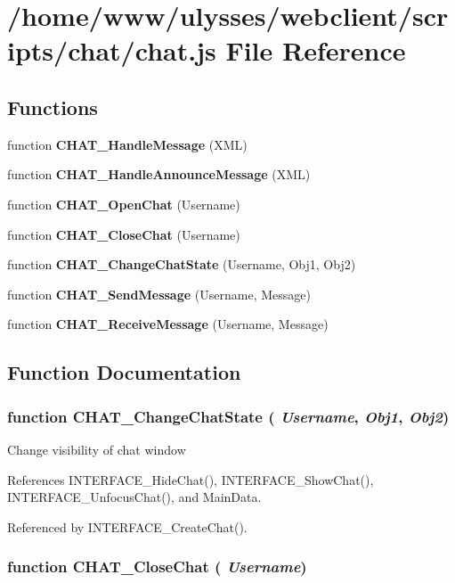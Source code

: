 \section{/home/www/ulysses/webclient/scripts/chat/chat.js File Reference}
\label{chat_2chat_8js}
\subsection*{Functions}
\begin{CompactItemize}
\item 
function {\bf CHAT\_\-HandleMessage} (XML)
\item 
function {\bf CHAT\_\-HandleAnnounceMessage} (XML)
\item 
function {\bf CHAT\_\-OpenChat} (Username)
\item 
function {\bf CHAT\_\-CloseChat} (Username)
\item 
function {\bf CHAT\_\-ChangeChatState} (Username, Obj1, Obj2)
\item 
function {\bf CHAT\_\-SendMessage} (Username, Message)
\item 
function {\bf CHAT\_\-ReceiveMessage} (Username, Message)
\end{CompactItemize}


\subsection{Function Documentation}
\subsubsection{\setlength{\rightskip}{0pt plus 5cm}function CHAT\_\-ChangeChatState ( {\em Username}, \/   {\em Obj1}, \/   {\em Obj2})}\label{chat_2chat_8js_5378e4be2e6578320879a903cabc1ec8}


Change visibility of chat window 

References INTERFACE\_\-HideChat(), INTERFACE\_\-ShowChat(), INTERFACE\_\-UnfocusChat(), and MainData.

Referenced by INTERFACE\_\-CreateChat().
\subsubsection{\setlength{\rightskip}{0pt plus 5cm}function CHAT\_\-CloseChat ( {\em Username})}\label{chat_2chat_8js_c9f7e14cbc16fc2651af090c9897cd14}


